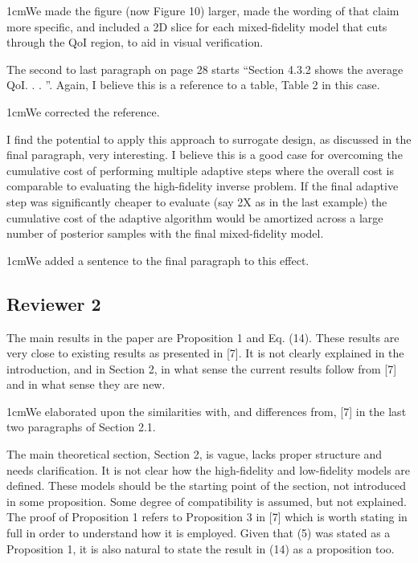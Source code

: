 \documentclass[12pt, letterpaper]{article}
\newcommand{\answer}[1]{\begin{adjustwidth}{1cm}{}{\color{blue}#1}\end{adjustwidth}}
\begin{document}
\answer{We made the figure (now Figure 10) larger, made the wording of that claim more specific, and included a 2D slice for each mixed-fidelity model that cuts through the QoI region, to aid in visual verification.}

The second to last paragraph on page 28 starts “Section 4.3.2 shows the average QoI. . . ”. Again, I
believe this is a reference to a table, Table 2 in this case.

\answer{We corrected the reference.}

I find the potential to apply this approach to surrogate design, as discussed in the final paragraph, very
interesting. I believe this is a good case for overcoming the cumulative cost of performing multiple
adaptive steps where the overall cost is comparable to evaluating the high-fidelity inverse problem.
If the final adaptive step was significantly cheaper to evaluate (say 2X as in the last example) the
cumulative cost of the adaptive algorithm would be amortized across a large number of posterior
samples with the final mixed-fidelity model.

\answer{We added a sentence to the final paragraph to this effect.}


\subsection*{Reviewer 2}

The main results in the paper are Proposition 1 and Eq. (14). These results are very close to existing results as presented in [7]. It is not clearly explained in the introduction, and in Section 2, in what sense the current results follow from [7] and in what sense they are new.

\answer{We elaborated upon the similarities with, and differences from, [7] in the last two paragraphs of Section 2.1.}

The main theoretical section, Section 2, is vague, lacks proper structure and needs clarification. It is not clear how the high-fidelity and low-fidelity models are defined. These models should be the starting point of the section, not introduced in some proposition. Some degree of compatibility is assumed, but not explained. The proof of Proposition 1 refers to Proposition 3 in [7] which is worth stating in full in order to understand how it is employed. Given that (5) was stated as a Proposition 1, it is also natural to state the result in (14) as a proposition too.
\end{document}
